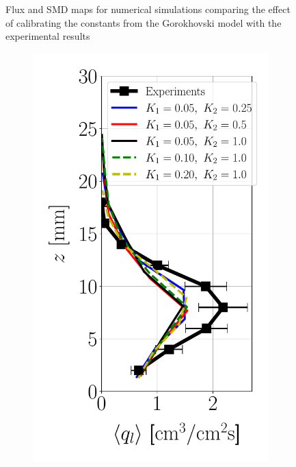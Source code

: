 \begin{figure}[t!]
\caption{Flux and SMD maps for numerical simulations comparing the effect of calibrating the constants from the Gorokhovski model with the experimental results}
\label{fig:maps_LGS_JICF_second_atom_apte_calibration}
\end{figure}






\clearpage


\begin{figure}[t!]
\flushleft
\begin{subfigure}[b]{0.2\textwidth}
	\flushleft
   \includegraphics[scale=0.35]{./part2_developments/figures_ch6_lagrangian_JICF/apte_model_calibration_u_vw_lognorm/profiles/flux_along_z}

\end{subfigure}
\end{figure}
